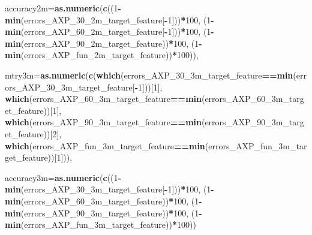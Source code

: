 \documentclass[]{article}
\newenvironment{Shaded}{\begin{snugshade}}{\end{snugshade}}
\newcommand{\KeywordTok}[1]{\textcolor[rgb]{0.13,0.29,0.53}{\textbf{#1}}}
\newcommand{\DataTypeTok}[1]{\textcolor[rgb]{0.13,0.29,0.53}{#1}}
\newcommand{\DecValTok}[1]{\textcolor[rgb]{0.00,0.00,0.81}{#1}}
\newcommand{\OperatorTok}[1]{\textcolor[rgb]{0.81,0.36,0.00}{\textbf{#1}}}
\newcommand{\NormalTok}[1]{#1}
\begin{document}
\begin{Shaded}
\begin{Highlighting}[]
                 \DataTypeTok{accuracy2m=}\KeywordTok{as.numeric}\NormalTok{(}\KeywordTok{c}\NormalTok{((}\DecValTok{1}\OperatorTok{-}\KeywordTok{min}\NormalTok{(errors_AXP_30_2m_target_feature[}\OperatorTok{-}\DecValTok{1}\NormalTok{]))}\OperatorTok{*}\DecValTok{100}\NormalTok{,}
\NormalTok{                                    (}\DecValTok{1}\OperatorTok{-}\KeywordTok{min}\NormalTok{(errors_AXP_60_2m_target_feature[}\OperatorTok{-}\DecValTok{1}\NormalTok{]))}\OperatorTok{*}\DecValTok{100}\NormalTok{,}
\NormalTok{                                    (}\DecValTok{1}\OperatorTok{-}\KeywordTok{min}\NormalTok{(errors_AXP_90_2m_target_feature))}\OperatorTok{*}\DecValTok{100}\NormalTok{,}
\NormalTok{                                    (}\DecValTok{1}\OperatorTok{-}\KeywordTok{min}\NormalTok{(errors_AXP_fun_2m_target_feature))}\OperatorTok{*}\DecValTok{100}\NormalTok{)),}
              
              
              \DataTypeTok{mtry3m=}\KeywordTok{as.numeric}\NormalTok{(}\KeywordTok{c}\NormalTok{(}\KeywordTok{which}\NormalTok{(errors_AXP_30_3m_target_feature}\OperatorTok{==}\KeywordTok{min}\NormalTok{(errors_AXP_30_3m_target_feature[}\OperatorTok{-}\DecValTok{1}\NormalTok{]))[}\DecValTok{1}\NormalTok{],}
                                    \KeywordTok{which}\NormalTok{(errors_AXP_60_3m_target_feature}\OperatorTok{==}\KeywordTok{min}\NormalTok{(errors_AXP_60_3m_target_feature))[}\DecValTok{1}\NormalTok{],}
                                   \KeywordTok{which}\NormalTok{(errors_AXP_90_3m_target_feature}\OperatorTok{==}\KeywordTok{min}\NormalTok{(errors_AXP_90_3m_target_feature))[}\DecValTok{2}\NormalTok{],}
                                   \KeywordTok{which}\NormalTok{(errors_AXP_fun_3m_target_feature}\OperatorTok{==}\KeywordTok{min}\NormalTok{(errors_AXP_fun_3m_target_feature))[}\DecValTok{1}\NormalTok{])),}
              
              \DataTypeTok{accuracy3m=}\KeywordTok{as.numeric}\NormalTok{(}\KeywordTok{c}\NormalTok{((}\DecValTok{1}\OperatorTok{-}\KeywordTok{min}\NormalTok{(errors_AXP_30_3m_target_feature[}\OperatorTok{-}\DecValTok{1}\NormalTok{]))}\OperatorTok{*}\DecValTok{100}\NormalTok{,}
\NormalTok{                                    (}\DecValTok{1}\OperatorTok{-}\KeywordTok{min}\NormalTok{(errors_AXP_60_3m_target_feature))}\OperatorTok{*}\DecValTok{100}\NormalTok{,}
\NormalTok{                                    (}\DecValTok{1}\OperatorTok{-}\KeywordTok{min}\NormalTok{(errors_AXP_90_3m_target_feature))}\OperatorTok{*}\DecValTok{100}\NormalTok{,}
\NormalTok{                                    (}\DecValTok{1}\OperatorTok{-}\KeywordTok{min}\NormalTok{(errors_AXP_fun_3m_target_feature))}\OperatorTok{*}\DecValTok{100}\NormalTok{))}
              

\end{Highlighting}
\end{Shaded}
\end{document}

